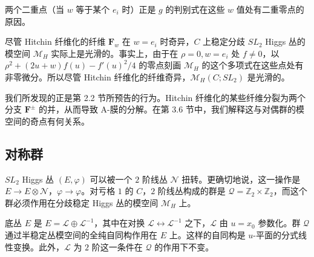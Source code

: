 \documentclass[11pt,a4paper]{article}
\begin{document}

两个二重点（当 $w$ 等于某个 $e_i$ 时）正是 $g$ 的判别式在这些 $w$ 值处有二重零点的原因。

尽管 Hitchin 纤维化的纤维 $\boldsymbol{F}_w$ 在 $w=e_i$ 时奇异，$C$ 上稳定分歧 $SL_2$ Higgs 丛的模空间 $\mathcal{M}_H$ 实际上是光滑的。事实上，由于在 $\rho=0,w=e_i$ 处 $f\ne 0$，以 $\rho^2+(2u+w)f(u)-f'(u)^2/4$ 的零点刻画 $\mathcal{M}_H$ 的这个多项式在这些点处有非零微分。所以尽管 Hitchin 纤维化的纤维奇异，$\mathcal{M}_H(C;SL_2)$ 是光滑的。

我们所发现的正是第 2.2 节所预告的行为。Hitchin 纤维化的某些纤维分裂为两个分支 $\boldsymbol{F}^{\pm}$ 的并，从而导致 A-膜的分解。在第 3.6 节中，我们解释这与对偶群的模空间的奇点有何关系。

\subsection{对称群}

$SL_2$ Higgs 丛 $(E,\varphi)$ 可以被一个 $2$ 阶线丛 $\mathcal{N}$ 扭转。更确切地说，这一操作是 $E\to E\otimes\mathcal{N}$，$\varphi\to\varphi$。对亏格 $1$ 的 $C$，$2$ 阶线丛构成的群是 $\mathcal{Q}=\mathbb{Z}_2\times\mathbb{Z}_2$，而这个群必须作用在分歧稳定 Higgs 丛的模空间 $\mathcal{M}_H$ 上。

底丛 $E$ 是 $E=\mathcal{L}\oplus\mathcal{L}^{-1}$，其中在对换 $\mathcal{L}\leftrightarrow\mathcal{L}^{-1}$ 之下，$\mathcal{L}$ 由 $u=x_0$ 参数化。群 $\mathcal{Q}$ 通过半稳定丛模空间的全纯自同构作用在 $E$ 上。这样的自同构是 $u$-平面的分式线性变换。此外，$\mathcal{L}$ 为 $2$ 阶这一条件在 $\mathcal{Q}$ 的作用下不变。
\end{document}

